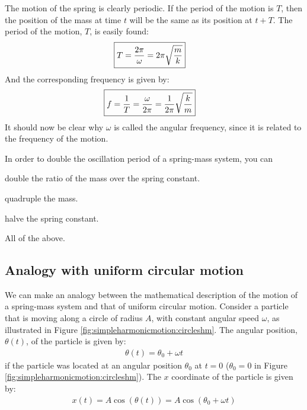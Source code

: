 The motion of the spring is clearly periodic. If the period of the motion is $T$, then the position of the mass at time $t$ will be the same as its position at $t+T$. The period of the motion, $T$, is easily found:
\begin{align}
\Aboxed{T&=\frac{2\pi}{\omega}=2\pi\sqrt{\frac{m}{k}}}
\end{align}
And the corresponding frequency is given by:
\begin{align}
\Aboxed{f = \frac{1}{T}=\frac{\omega}{2\pi}=\frac{1}{2\pi}\sqrt{\frac{k}{m}}}
\end{align}
It should now be clear why $\omega$ is called the angular frequency, since it is related to the frequency of the motion.

\begin{checkpoint}\label{cp:simpleharmonicmotion:period}
\begin{MCquestion}{In order to double the oscillation period of a spring-mass system, you can}
\item double the ratio of the mass over the spring constant.
\item quadruple the mass. \correct
\item halve the spring constant.
\item All of the above. 
\end{MCquestion}
\end{checkpoint}

\subsection{Analogy with uniform circular motion}
We can make an analogy between the mathematical description of the motion of a spring-mass system and that of uniform circular motion. Consider a particle that is moving along a circle of radius $A$, with constant angular speed $\omega$, as illustrated in Figure \ref{fig:simpleharmonicmotion:circleshm}.
The angular position, $\theta(t)$, of the particle is given by:
\begin{align*}
\theta(t) = \theta_0 + \omega t
\end{align*}
if the particle was located at an angular position $\theta_0$ at $t=0$ ($\theta_0=0$ in Figure \ref{fig:simpleharmonicmotion:circleshm}). The $x$ coordinate of the particle is given by:
\begin{align*}
x(t) = A\cos(\theta(t)) = A\cos(\theta_0 + \omega t)
\end{align*}

